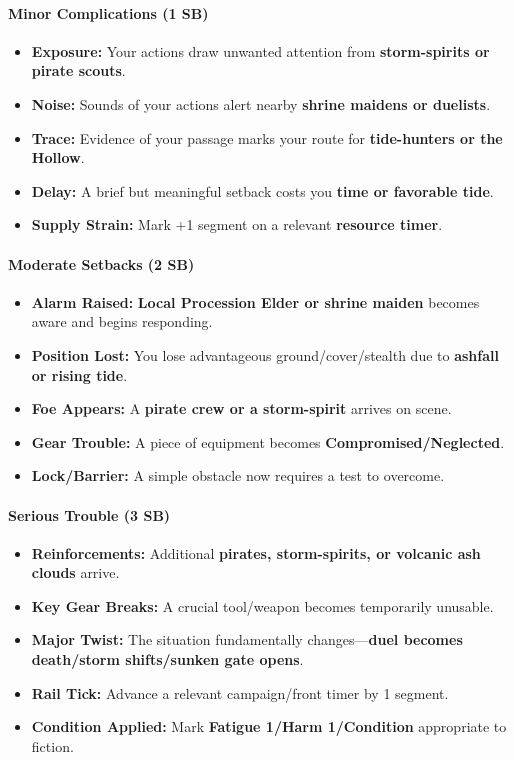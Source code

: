 \paragraph{Minor Complications (1 SB)}
\begin{itemize}
\item \textbf{Exposure:} Your actions draw unwanted attention from \textbf{storm-spirits or pirate scouts}.
\item \textbf{Noise:} Sounds of your actions alert nearby \textbf{shrine maidens or duelists}.
\item \textbf{Trace:} Evidence of your passage marks your route for \textbf{tide-hunters or the Hollow}.
\item \textbf{Delay:} A brief but meaningful setback costs you \textbf{time or favorable tide}.
\item \textbf{Supply Strain:} Mark +1 segment on a relevant \textbf{resource timer}.
\end{itemize}

\paragraph{Moderate Setbacks (2 SB)}
\begin{itemize}
\item \textbf{Alarm Raised:} \textbf{Local Procession Elder or shrine maiden} becomes aware and begins responding.
\item \textbf{Position Lost:} You lose advantageous ground/cover/stealth due to \textbf{ashfall or rising tide}.
\item \textbf{Foe Appears:} A \textbf{pirate crew or a storm-spirit} arrives on scene.
\item \textbf{Gear Trouble:} A piece of equipment becomes \textbf{Compromised/Neglected}.
\item \textbf{Lock/Barrier:} A simple obstacle now requires a test to overcome.
\end{itemize}

\paragraph{Serious Trouble (3 SB)}
\begin{itemize}
\item \textbf{Reinforcements:} Additional \textbf{pirates, storm-spirits, or volcanic ash clouds} arrive.
\item \textbf{Key Gear Breaks:} A crucial tool/weapon becomes temporarily unusable.
\item \textbf{Major Twist:} The situation fundamentally changes---\textbf{duel becomes death/storm shifts/sunken gate opens}.
\item \textbf{Rail Tick:} Advance a relevant campaign/front timer by 1 segment.
\item \textbf{Condition Applied:} Mark \textbf{Fatigue 1/Harm 1/Condition} appropriate to fiction.
\end{itemize}

